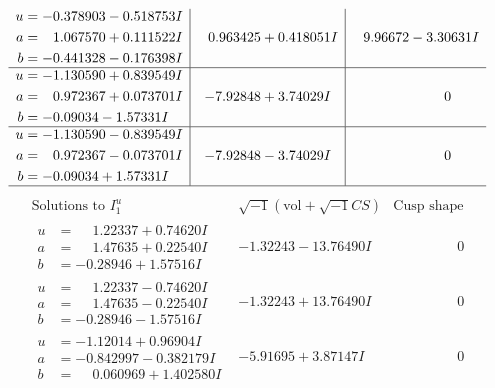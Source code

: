\documentclass[1p]{elsarticle_modified}
\theoremstyle{definition}
\newcommand{\I}{\sqrt{-1}}
\begin{document}
$$\begin{array}{c|c|c}
\begin{aligned}
u &= -0.378903 - 0.518753 I \\
a &= \phantom{-}1.067570 + 0.111522 I \\
b &= -0.441328 - 0.176398 I\end{aligned}
 & \phantom{-}0.963425 + 0.418051 I & \phantom{-}9.96672 - 3.30631 I \\ \hline\begin{aligned}
u &= -1.130590 + 0.839549 I \\
a &= \phantom{-}0.972367 + 0.073701 I \\
b &= -0.09034 - 1.57331 I\end{aligned}
 & -7.92848 + 3.74029 I & \phantom{-0.000000 } 0 \\ \hline\begin{aligned}
u &= -1.130590 - 0.839549 I \\
a &= \phantom{-}0.972367 - 0.073701 I \\
b &= -0.09034 + 1.57331 I\end{aligned}
 & -7.92848 - 3.74029 I & \phantom{-0.000000 } 0\\
 \hline 
 \end{array}$$\newpage$$\begin{array}{c|c|c}  
\text{Solutions to }I^u_{1}& \I (\text{vol} + \sqrt{-1}CS) & \text{Cusp shape}\\
 \hline 
\begin{aligned}
u &= \phantom{-}1.22337 + 0.74620 I \\
a &= \phantom{-}1.47635 + 0.22540 I \\
b &= -0.28946 + 1.57516 I\end{aligned}
 & -1.32243 - 13.76490 I & \phantom{-0.000000 } 0 \\ \hline\begin{aligned}
u &= \phantom{-}1.22337 - 0.74620 I \\
a &= \phantom{-}1.47635 - 0.22540 I \\
b &= -0.28946 - 1.57516 I\end{aligned}
 & -1.32243 + 13.76490 I & \phantom{-0.000000 } 0 \\ \hline\begin{aligned}
u &= -1.12014 + 0.96904 I \\
a &= -0.842997 - 0.382179 I \\
b &= \phantom{-}0.060969 + 1.402580 I\end{aligned}
 & -5.91695 + 3.87147 I & \phantom{-0.000000 } 0 \\ \hline\begin{aligned}

\end{aligned}
\end{array}$$
\end{document}
